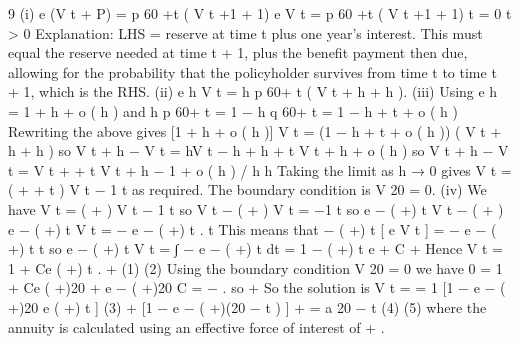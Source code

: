 \documentclass[a4paper,12pt]{article}
\begin{document}
9
(i)
e \delta \; (V t + P) = p 60 +t ( V t +1 + 1)
e \delta \; V t = p 60 +t ( V t +1 + 1)
t = 0
t > 0
Explanation: LHS = reserve at time t plus one year’s interest. This must equal
the reserve needed at time t + 1, plus the benefit payment then due, allowing
for the probability that the policyholder survives from time t to time t + 1,
which is the RHS.
(ii) e \delta \;h V t = h p 60+ t ( V t + h + h ).
(iii) Using e \delta \;h = 1 + \delta \; h + o ( h )
and h p 60+ t = 1 − h q 60+ t = 1 − h + t + o ( h )
Rewriting the above gives
[1 + \delta \; h + o ( h )] V t = (1 − h + t + o ( h )) ( V t + h + h )
so V t + h − V t = \delta \; hV t − h + h + t V t + h + o ( h )
so V t + h − V t
= \delta \; V t +  + t V t + h − 1 + o ( h ) / h
h
Taking the limit as h → 0 gives
\frac{\partial}{\partial } V t
= (\delta \; + + t ) V t − 1
\frac{\partial}{\partial } t
as required. The boundary condition is
V 20 = 0.
(iv)
We have
\frac{\partial}{\partial } V t
= (\delta \; + \mu) V t − 1
\frac{\partial}{\partial } t
so \frac{\partial}{\partial } V t
− (\delta \; + \mu) V t = −1
\frac{\partial}{\partial } t
so e − ( \delta \;+\mu ) t
\frac{\partial}{\partial } V t
− ( \delta \; + \mu ) e − ( \delta \;+\mu ) t V t = − e − ( \delta \;+\mu ) t .
\frac{\partial}{\partial } t
This means that
\frac{\partial}{\partial } − ( \delta \;+\mu ) t
[ e
V t ] = − e − ( \delta \;+\mu ) t
\frac{\partial}{\partial } t
so
e − ( \delta \;+\mu ) t V t = ∫ − e − ( \delta \;+\mu ) t dt
=
1 − ( \delta \;+\mu ) t
e
+ C
\delta \;+\mu
Hence
V t =
1
+ Ce ( \delta \;+\mu ) t .
\delta \;+\mu
(1)
(2)%
Using the boundary condition V 20 = 0 we have
0 =
1
+ Ce ( \delta \;+\mu )20
\delta \;+\mu
e − ( \delta \;+\mu )20
C = −
.
so
\delta \;+\mu
So the solution is
V t =
=
1
[1 − e − ( \delta \;+\mu )20 e ( \delta \;+\mu ) t ] (3)
\delta \;+
[1 − e − ( \delta \;+\mu )(20 − t ) ]
\delta \;+\mu
= a 20 − t
(4)
(5)
where the annuity is calculated using an effective force of interest of \delta \; + \mu.
\end{document}

